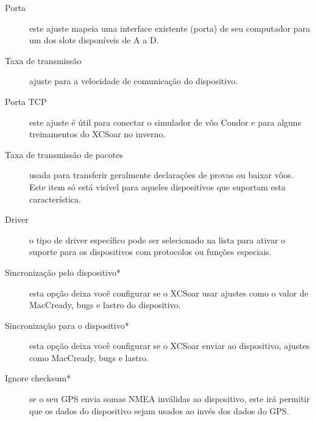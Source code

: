 \begin{description}
\item[Porta] este ajuste mapeia uma interface existente (porta) de seu computador para um dos slots disponíveis de A a D.
\item[Taxa de transmissão]  ajuste para a velocidade de comunicação do dispositivo.
\item[Porta TCP]  este ajuste é útil para conectar o simulador de vôo Condor e para alguns treinamentos do XCSoar no inverno.
\item[Taxa de transmissão de pacotes]  usada para transferir geralmente declarações de provas ou baixar vôos.  Este item só está visível para aqueles dispositivos que suportam esta característica.
\item[Driver] o tipo de driver específico pode ser selecionado na lista para ativar o suporte para os dispositivos com protocolos ou funções especiais.
\item[Sincronização pelo dispositivo*]  esta opção deixa você configurar se o XCSoar usar ajustes como o valor de MacCready, bugs e lastro do dispositivo.
\item[Sincronização para o dispositivo*]  esta opção deixa você configurar se o XCSoar enviar ao dispositivo, ajustes como MacCready, bugs e lastro.
\item[Ignore checksum*] se o seu GPS envia somas NMEA inválidas ao dispositivo, este irá permitir que os dados do dispositivo sejam usados ao invés dos dados do GPS. 
\end{description}

